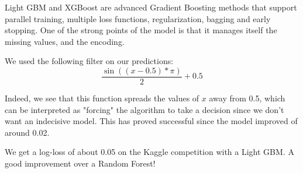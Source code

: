 \documentclass{article}
\begin{document}
Light GBM and XGBoost are advanced Gradient Boosting methods that support parallel training, multiple loss functions, regularization, bagging and early stopping.
One of the strong points of the model is that it manages itself the missing values, and the encoding.

We used the following filter on our predictions: 
$$\frac{\sin\left((x-0.5)*\pi\right)}{2}+0.5$$
\begin{markdown}
Indeed, we see that this function spreads the values of $x$ away from 0.5, which can be interpreted as "forcing" the algorithm to take a decision since we don't want an indecisive model. This has proved successful since the model improved of around 0.02.
\end{markdown}


We get a log-loss of about 0.05 on the Kaggle competition with a Light GBM. A good improvement over a Random Forest!
\end{document}
